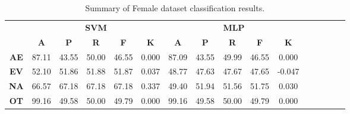 \begin{landscape}
\begin{table}[htbp]
\footnotesize
\centering
\caption{Summary of Female dataset classification results.}
\label{tab:base_female}
\begin{tabular}{|c|c|c|c|c|c|c|c|c|c|c|c|c|c|c|c|}
\hline
\multirow{2}{*}{}	& \multicolumn{5}{c|}{\textbf{SVM}}												& \multicolumn{5}{c|}{\textbf{MLP}}												\\ \cline{2-11} 
					& \textbf{A}	& \textbf{P}	& \textbf{R}	& \textbf{F}	& \textbf{K}	& \textbf{A}	& \textbf{P}	& \textbf{R}	& \textbf{F}	& \textbf{K}	\\ \hline
\textbf{AE}			& 87.11			& 43.55			& 50.00			& 46.55			& 0.000			& 87.09			& 43.55			& 49.99			& 46.55			& 0.000			\\ \hline
\textbf{EV}			& 52.10			& 51.86			& 51.88			& 51.87			& 0.037			& 48.77			& 47.63			& 47.67			& 47.65			& -0.047			\\ \hline
\textbf{NA}			& 66.57			& 67.18			& 67.18			& 67.18			& 0.337			& 49.40			& 51.94			& 51.56			& 51.75			& 0.030			\\ \hline
\textbf{OT}			& 99.16			& 49.58			& 50.00			& 49.79			& 0.000			& 99.16			& 49.58			& 50.00			& 49.79			& 0.000			\\ \hline
\end{tabular}
\end{table}
\end{landscape}